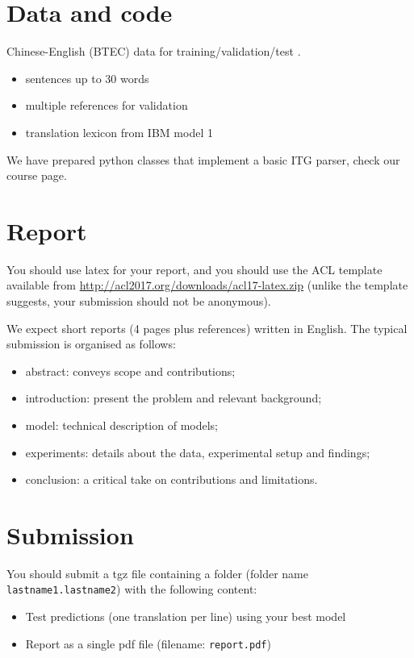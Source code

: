 \section{Data and code}

Chinese-English (BTEC) data for training/validation/test \citep{Takezawa+2002:BTEC}.
\begin{itemize}
	\item sentences up to 30 words
	\item multiple references for validation
	\item translation lexicon from IBM model 1
\end{itemize}

We have prepared python classes that implement a basic ITG parser, check our course page.


\section{Report}

You should use latex for your report, and you should use the ACL template available from \url{http://acl2017.org/downloads/acl17-latex.zip} (unlike the template suggests, your submission should not be anonymous). 

We expect short reports (4 pages plus references) written in English. The typical submission is organised as follows: 
\begin{itemize}
	\item abstract: conveys scope and contributions;
	\item introduction: present the problem and relevant background;
	\item model: technical description of models;
	\item experiments: details about the data, experimental setup and findings;
	\item conclusion: a critical take on contributions and limitations.
\end{itemize}


\section{Submission}

You should submit a tgz file containing a folder (folder name {\tt lastname1.lastname2}) with the following content: 
\begin{itemize}
	\item Test predictions (one translation per line) using your best model
	\item Report as a single pdf file (filename: {\tt report.pdf})
\end{itemize}

